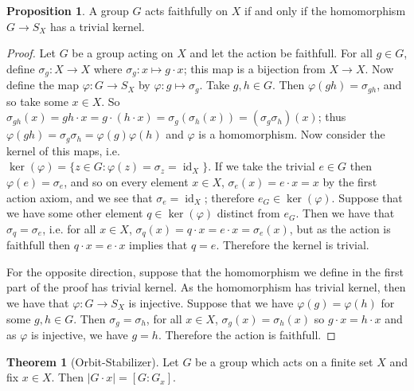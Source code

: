 \documentclass[9pt,reqno]{amsart}
\theoremstyle{definition}
\newtheorem{theorem}{Theorem}[section]
\newtheorem{prop}{Proposition}[section]
\DeclareMathOperator{\id}{id}
\begin{document}
\begin{prop}
	A group $G$ acts faithfully on $X$ if and only if the homomorphism $G \to S_X$ has a trivial kernel. 
\end{prop}
\begin{proof}
Let $G$ be a group acting on $X$ and let the action be faithfull. For all $g \in G$, define $\sigma_g \colon X \to X$ where $\sigma_g \colon x \mapsto g \cdot x$; this map is a bijection from $X \to X$. Now define the map $\varphi \colon G \to S_X$ by $\varphi \colon g \mapsto \sigma_g$. Take  $g, h \in G$. Then $\varphi (gh) = \sigma_{gh}$, and so take some $x \in X$. So $\sigma_{gh} (x) = gh \cdot x = g\cdot (h \cdot x) = \sigma _g (\sigma_h (x)) = (\sigma_g \sigma_h)(x)$; thus $\varphi(gh) = \sigma _g \sigma_h = \varphi(g) \varphi(h)$ and $\varphi$ is a homomorphism. Now consider the kernel of this maps, i.e. \\ $\ker (\varphi) = \{z \in G \colon \varphi (z) = \sigma_z =\id_X \}$. If we take the trivial $e \in G$ then $\varphi (e) = \sigma_e$, and so on every element $x \in X$, $\sigma_{e} (x) = e \cdot x = x$ by the first action axiom, and we see that $\sigma_e = \id_X$; therefore $e_G \in \ker (\varphi)$. Suppose that we have some other element $q \in \ker (\varphi)$ distinct from $e_G$. Then we have that $\sigma_q = \sigma_e$, i.e. for all $x \in X$, $\sigma_q (x) = q \cdot x = e \cdot x = \sigma_e (x)$, but as the action is faithfull then $q \cdot x = e \cdot x$ implies that $q = e$. Therefore the kernel is trivial.

For the opposite direction, suppose that the homomorphism we define in the first part of the proof has trivial kernel. As the homomorphism has trivial kernel, then we have that $\varphi \colon G \to S_X$ is injective. Suppose that we have $\varphi (g) = \varphi(h)$ for some $g, h \in G$. Then $\sigma_g = \sigma_h$, for all $x \in X$, $\sigma_g (x) = \sigma_h (x)$ so $g \cdot x = h \cdot x$ and as $\varphi $ is injective, we have $g = h$. Therefore the action is faithfull.
\end{proof}
\begin{theorem}[Orbit-Stabilizer]
	Let $G$ be a group which acts on a finite set $X$ and fix $x \in X$. Then $ |G \cdot x| = [G \colon G_x].$
\end{theorem}
\end{document}
